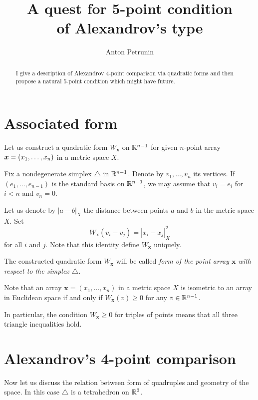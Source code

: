 \documentclass{article}
\begin{document}
\title{A quest for 5-point condition\\ of Alexandrov's type}
\author{Anton Petrunin}
\date{}
\maketitle
\begin{abstract}
I give a description of Alexandrov 4-point comparison
via quadratic forms
and then propose a natural 5-point condition which might have future.
\end{abstract}


\section*{Associated form}

Let us construct a quadratic form $W_{\bm{x}}$ on $\mathbb{R}^{n-1}$ 
for given $n$-point array $\bm{x}\z=(x_1,\dots,x_n)$ in a metric space $X$.

Fix a nondegenerate simplex $\triangle$ in $\mathbb{R}^{n-1}$.
Denote by $v_1,\dots,v_n$ its vertices.
If $(e_1,\dots,e_{n-1})$ is the standard basis on $\mathbb{R}^{n-1}$,
we may assume that $v_i=e_i$ for $i<n$ and $v_n=0$.

Let us denote by $|a-b|_X$ the distance between points $a$ and $b$ in the metric space $X$.
Set
\[W_{\bm{x}}(v_i-v_j)=|x_i-x_j|^2_X\] 
for all $i$ and $j$.
Note that this identity define $W_{\bm{x}}$ uniquely.


The constructed quadratic form $W_{\bm{x}}$ will be called \emph{form of the point array $\bm{x}$ with respect to the simplex $\triangle$}.

Note that an array $\bm{x}=(x_1,\dots,x_n)$ in a metric space $X$ is isometric to an array in Euclidean space if and only if 
$W_{\bm{x}}(v)\ge 0$
for any $v\in \mathbb{R}^{n-1}$.

In particular,  the
condition $W_{\bm{x}}\ge 0$ for triples of points means that 
all three triangle inequalities hold. 

\section*{Alexandrov's 4-point comparison}

Now let us discuss the relation between form of quadruples
and geometry of the space.
In this case $\triangle$ is a tetrahedron on $\mathbb{R}^3$.
\end{document}
